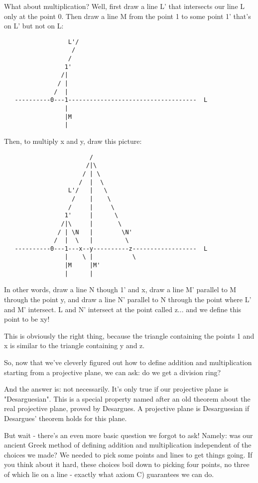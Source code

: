 What about multiplication?  Well, first draw a line L' that intersects
our line L only at the point 0.  Then draw a line M from the point 1 to
some point 1' that's on L' but not on L:

\begin{verbatim}
                  L'/
                   / 
                  /
                 1'
                /|
               / |
              /  |
   ----------0---1------------------------------------  L
                 |
                 |M
                 |
\end{verbatim}
    
Then, to multiply x and y, draw this picture:
\begin{verbatim}
                        /
                       /|\   
                      / | \
                     /  |  \
                  L'/   |   \
                   /    |    \
                  /     |     \
                 1'     |      \
                /|\     |       \
               / | \N   |        \N'
              /  |  \   |         \
   ----------0---1---x--y----------z------------------  L
                 |    \ |           \
                 |M     |M'
                 |      |
\end{verbatim}
    
In other words, draw a line N though 1' and x, draw a line M' parallel
to M through the point y, and draw a line N' parallel to N through the
point where L' and M' intersect.  L and N' intersect at the point called
z... and we define this point to be xy!

This is obviously the right thing, because the triangle containing
the points 1 and x is similar to the triangle containing y and z.  

So, now that we've cleverly figured out how to define addition and
multiplication starting from a projective plane, we can ask: do we
get a division ring?  

And the answer is: not necessarily.   It's only true if our projective
plane is "Desarguesian".  This is a special property named after an 
old theorem about the real projective plane, proved by Desargues.
A projective plane is Desarguesian if Desargues' theorem holds for
this plane.

But wait - there's an even more basic question we forgot to ask! 
Namely: was our ancient Greek method of defining addition and
multiplication independent of the choices we made?  We needed to pick
some points and lines to get things going.  If you think about it hard,
these choices boil down to picking four points, no three of which lie on
a line - exactly what axiom C) guarantees we can do.   

